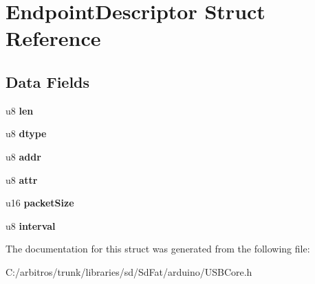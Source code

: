\hypertarget{struct_endpoint_descriptor}{\section{Endpoint\-Descriptor Struct Reference}
\label{struct_endpoint_descriptor}
}
\subsection*{Data Fields}
\begin{DoxyCompactItemize}
\item 
\hypertarget{struct_endpoint_descriptor_afbf3f3230446569534d5f466aaf4c23b}{u8 {\bfseries len}}\label{struct_endpoint_descriptor_afbf3f3230446569534d5f466aaf4c23b}

\item 
\hypertarget{struct_endpoint_descriptor_a0bb419531ec75697e63e9109fecf81b0}{u8 {\bfseries dtype}}\label{struct_endpoint_descriptor_a0bb419531ec75697e63e9109fecf81b0}

\item 
\hypertarget{struct_endpoint_descriptor_a7394c0f7cac587defeae4e84d34fb535}{u8 {\bfseries addr}}\label{struct_endpoint_descriptor_a7394c0f7cac587defeae4e84d34fb535}

\item 
\hypertarget{struct_endpoint_descriptor_a76705b0f72861d4d0bef909f56fb34ec}{u8 {\bfseries attr}}\label{struct_endpoint_descriptor_a76705b0f72861d4d0bef909f56fb34ec}

\item 
\hypertarget{struct_endpoint_descriptor_a198c21ff91822a72041d63f054615143}{u16 {\bfseries packet\-Size}}\label{struct_endpoint_descriptor_a198c21ff91822a72041d63f054615143}

\item 
\hypertarget{struct_endpoint_descriptor_a10a5b8a25e61bd366aeabe4da95b2cf2}{u8 {\bfseries interval}}\label{struct_endpoint_descriptor_a10a5b8a25e61bd366aeabe4da95b2cf2}

\end{DoxyCompactItemize}


The documentation for this struct was generated from the following file\-:\begin{DoxyCompactItemize}
\item 
C\-:/arbitros/trunk/libraries/sd/\-Sd\-Fat/arduino/U\-S\-B\-Core.\-h\end{DoxyCompactItemize}
